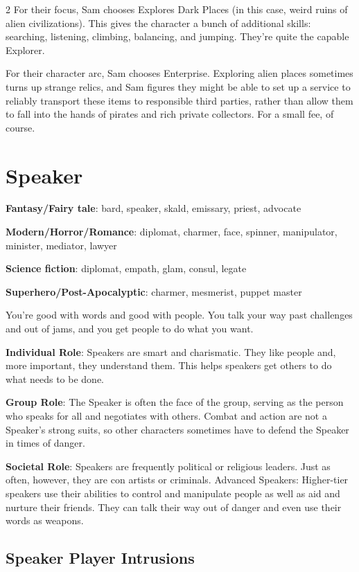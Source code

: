 \begin{multicols}{2}
For their focus, Sam chooses Explores Dark Places (in this case, weird ruins of alien civilizations). This gives the character a bunch of additional skills: searching, listening, climbing, balancing, and jumping. They’re quite the capable Explorer.

For their character arc, Sam chooses Enterprise. Exploring alien places sometimes turns up strange relics, and Sam figures they might be able to set up a service to reliably transport these items to responsible third parties, rather than allow them to fall into the hands of pirates and rich private collectors. For a small fee, of course.

\section{Speaker}

\textbf{Fantasy/Fairy tale}: bard, speaker, skald, emissary, priest, advocate

\textbf{Modern/Horror/Romance}: diplomat, charmer, face, spinner, manipulator, minister, mediator, lawyer

\textbf{Science fiction}: diplomat, empath, glam, consul, legate

\textbf{Superhero/Post-Apocalyptic}: charmer, mesmerist, puppet master

You’re good with words and good with people. You talk your way past challenges and out of jams, and you get people to do what you want.

\textbf{Individual Role}: Speakers are smart and charismatic. They like people and, more important, they understand them. This helps speakers get others to do what needs to be done. 

\textbf{Group Role}: The Speaker is often the face of the group, serving as the person who speaks for all and negotiates with others. Combat and action are not a Speaker’s strong suits, so other characters sometimes have to defend the Speaker in times of danger.

\textbf{Societal Role}: Speakers are frequently political or religious leaders. Just as often, however, they are con artists or criminals. 
Advanced Speakers: Higher-tier speakers use their abilities to control and manipulate people as well as aid and nurture their friends. They can talk their way out of danger and even use their words as weapons.

\subsection{Speaker Player Intrusions}


\end{multicols}
